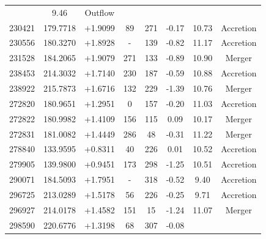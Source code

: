 \documentclass[fleqn,usenatbib]{mnras}
\begin{document}
\begin{table}
\begin{tabular*}{\linewidth}{cccccccc}
& 9.46%
& Outflow            \\
230421                    & 179.7718 & +1.9099 & 89                            & 271                         & -0.17%
& 10.73%
& Accretion          \\
230556                    & 180.3270 & +1.8928 & -                           & 139                         & -0.82%
& 11.17%
& Accretion          \\
231528                    & 184.2065 & +1.9079 & 271                           & 133                         & -0.89%
& 10.90%
& Merger             \\
238453                    & 214.3032 & +1.7140 & 230                           & 187                         & -0.59%
& 10.88%
& Accretion          \\
238922                    & 215.7873 & +1.6716 & 132                           & 229                         & -1.39%
& 10.76%
& Merger             \\
272820                    & 180.9651 & +1.2951 & 0                             & 157                         & -0.20%
& 11.03%
& Accretion          \\
272822                    & 180.9982 & +1.4109 & 156                           & 115                         & 0.09%
& 10.17%
& Merger             \\
272831                    & 181.0082 & +1.4449 & 286                           & 48                          & -0.31%
& 11.22%
& Merger             \\
278840                    & 133.9595 & +0.8311 & 40                            & 226                         & 0.01%
& 10.52%
& Accretion          \\
279905                    & 139.9800 & +0.9451 & 173                           & 298                         & -1.25%
& 10.51%
& Accretion          \\
290071                    & 184.5093 & +1.7951 & -                           & 318                         & -0.52%
& 9.40%
& Accretion          \\
296725                    & 213.0289 & +1.5178 & 56                            & 226                         & -0.25%
& 9.71%
& Accretion          \\
296927                    & 214.0178 & +1.4582 & 151                           & 15                          & -1.24%
& 11.07%
& Merger             \\
298590                    & 220.6776 & +1.3198 & 68                            & 307                         & -0.08%

\end{tabular*}
\end{table}
\end{document}
